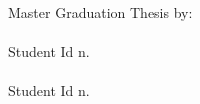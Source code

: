 \begin{titlepage}
\begin{center}
        \vfill  
        
        \flushright
        \normalsize{Master Graduation Thesis by:}\\
        \medskip \spacedlowsmallcaps{\myFirstAuthorName}\\
		Student Id n. \myMatrFirstAuthor \\ 
		\medskip\spacedlowsmallcaps{\mySecondAuthorName} \\
		Student Id n. \myMatrSecondAuthor \\
		
		\vfill 

		\centering {\myAcademicYear}                     

    \end{center}  
\end{titlepage}